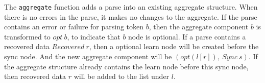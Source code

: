 {The {\tt aggregate} function adds a parse into an existing aggregate structure. When there is
no errors in the parse, it makes no changes to the aggregate. If the parse contains 
an error or failure for parsing token $b$, then the aggregate component 
$b$ is transformed to $opt~ b$, to indicate that $b$ node is optional. 
If a parse contains a recovered data $Recovered~ r$, then
a optional learn node will be created before the sync node. And the new aggregate component will be
$(opt (l [r]),~ Sync~ s)$. If the aggregate structure already contains the learn node before this
sync node, then recovered data $r$ will be added to the list under $l$.


}%



